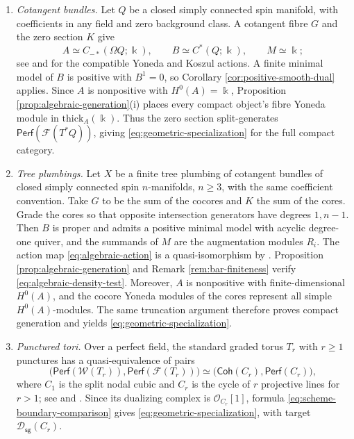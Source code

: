 \documentclass[11pt,letterpaper,reqno]{amsart}
\theoremstyle{plain}
\theoremstyle{definition}
\theoremstyle{plain}
\theoremstyle{definition}
\numberwithin{equation}{section}
\begin{document}
\begin{enumerate}
    \item \emph{Cotangent bundles.}
    Let $Q$ be a closed simply connected spin manifold, with coefficients in any field and zero background class.
    A cotangent fibre $G$ and the zero section $K$ give
    \[
    A\simeq C_{-*}(\Omega Q;\Bbbk),\qquad
    B\simeq C^*(Q;\Bbbk),\qquad M\simeq\Bbbk;
    \]
    see \cite[Theorem 1.1]{Abouzaid2011} and \cite[Introduction]{Ekholm-Lekili2023} for the compatible Yoneda and Koszul actions.
    A finite minimal model of $B$ is positive with $B^1=0$, so Corollary \ref{cor:positive-smooth-dual} applies.
    Since $A$ is nonpositive with $H^0(A)=\Bbbk$, Proposition \ref{prop:algebraic-generation}(i) places every compact object's fibre Yoneda module in $\mathrm{thick}_A(\Bbbk)$.
    Thus the zero section split-generates $\mathsf{Perf}(\mathscr F(T^*Q))$, giving \eqref{eq:geometric-specialization} for the full compact category.

    \item \emph{Tree plumbings.}
    Let $X$ be a finite tree plumbing of cotangent bundles of closed simply connected spin $n$-manifolds, $n\geqslant3$, with the same coefficient convention.
    Take $G$ to be the sum of the cocores and $K$ the sum of the cores.
    Grade the cores so that opposite intersection generators have degrees $1,n-1$.
    Then $B$ is proper and admits a positive minimal model with acyclic degree-one quiver, and the summands of $M$ are the augmentation modules $R_i$.
    The action map \eqref{eq:algebraic-action} is a quasi-isomorphism by \cite[Theorems 66, 68, and 83; Section 6.1.4]{Ekholm-Lekili2023}.
    Proposition \ref{prop:algebraic-generation} and Remark \ref{rem:bar-finiteness} verify \eqref{eq:algebraic-density-test}.
    Moreover, $A$ is nonpositive with finite-dimensional $H^0(A)$, and the cocore Yoneda modules of the cores represent all simple $H^0(A)$-modules.
    The same truncation argument therefore proves compact generation and yields \eqref{eq:geometric-specialization}.

    \item \emph{Punctured tori.}
    Over a perfect field, the standard graded torus $T_r$ with $r\geqslant1$ punctures has a quasi-equivalence of pairs
    \[
    \bigl(\mathsf{Perf}(\mathscr W(T_r)),\mathsf{Perf}(\mathscr F(T_r))\bigr)
    \simeq
    \bigl(\mathsf{Coh}(C_r),\mathsf{Perf}(C_r)\bigr),
    \]
    where $C_1$ is the split nodal cubic and $C_r$ is the cycle of $r$ projective lines for $r>1$; see \cite[Theorem 9.1]{Lekili-Perutz2015} and \cite[Corollary 3.4.1 and Theorem 3.7.2]{Lekili-Polishuk2017}.
    Since its dualizing complex is $\mathcal O_{C_r}[1]$, formula \eqref{eq:scheme-boundary-comparison} gives \eqref{eq:geometric-specialization}, with target $\mathscr D_{\mathsf{sg}}(C_r)$.
\end{enumerate}
\end{document}
